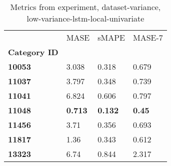 \begin{table}[H]
\centering
\caption{Metrics from experiment, dataset-variance, low-variance-lstm-local-univariate}
\label{table:low-variance-lstm-local-univariate-dataset-variance}
\begin{tabular}{llll}
\toprule
{} &            MASE &           sMAPE &         MASE-7 \\
\textbf{Category ID} &                 &                 &                \\
\midrule
\textbf{10053      } &           3.038 &           0.318 &          0.679 \\
\textbf{11037      } &           3.797 &           0.348 &          0.739 \\
\textbf{11041      } &           6.824 &           0.606 &          0.797 \\
\textbf{11048      } &  \textbf{0.713} &  \textbf{0.132} &  \textbf{0.45} \\
\textbf{11456      } &            3.71 &           0.356 &          0.693 \\
\textbf{11817      } &            1.36 &           0.343 &          0.612 \\
\textbf{13323      } &            6.74 &           0.844 &          2.317 \\
\bottomrule
\end{tabular}
\end{table}
